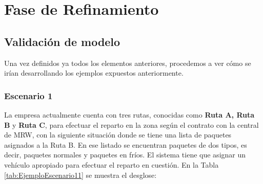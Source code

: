 \section{Fase de Refinamiento}

\subsection{Validación de modelo}

Una vez definidos ya todos los elementos anteriores, procedemos a ver cómo se irían desarrollando los ejemplos expuestos anteriormente.

\subsubsection{Escenario 1}

La empresa actualmente cuenta con tres rutas, conocidas como \textbf{Ruta A, Ruta B} y \textbf{Ruta C}, para efectuar el reparto en la zona según el contrato con la central de MRW, con la siguiente situación donde se tiene una lista de paquetes asignados a la Ruta B. En ese listado se encuentran paquetes de dos tipos, es decir, paquetes normales y paquetes en fríos. El sistema tiene que asignar un vehículo apropiado para efectuar el reparto en cuestión. En la Tabla \ref{tab:EjemploEscenario11} se muestra el desglose:

